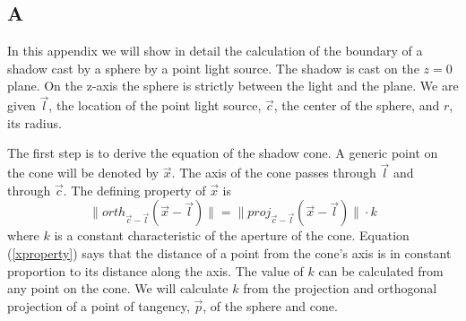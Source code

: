 \documentclass[letter,10pt]{article}
\begin{document}
\begin{appendices}
\chapter{A} \label{a}

In this appendix we will show in detail the calculation of the boundary of a shadow cast by a sphere by a point light source. The shadow is cast on the $z=0$ plane. On the z-axis the sphere is strictly between the light and the plane. We are given $\vec{l}$, the location of the point light source, $\vec{c}$, the center of the sphere, and $r$, its radius.

The first step is to derive the equation of the shadow cone. A generic point on the cone will be denoted by $\vec{x}$. The axis of the cone passes through $\vec{l}$ and through $\vec{c}$. The defining property of $\vec{x}$ is 
\begin{equation}\label{xproperty}
\|orth_{\vec{c}-\vec{l}} (\vec{x} - \vec{l})\| = \|proj_{\vec{c}-\vec{l}} (\vec{x} - \vec{l})\| \cdot k
\end{equation}
where $k$ is a constant characteristic of the aperture of the cone. Equation (\ref{xproperty}) says that the distance of a point from the cone's axis is in constant proportion to its distance along the axis. The value of $k$ can be calculated from any point on the cone. We will calculate $k$ from the projection and orthogonal projection of a point of tangency, $\vec{p}$, of the sphere and cone.


\end{appendices}
\end{document}
